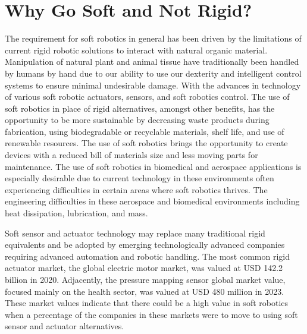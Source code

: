 \section{Why Go Soft and Not Rigid?}
The requirement for soft robotics in general has been driven by the limitations of current rigid robotic solutions to interact with natural organic material. Manipulation of natural plant and animal tissue have traditionally been handled by humans by hand due to our ability to use our dexterity and intelligent control systems to ensure minimal undesirable damage. With the advances in technology of various soft robotic actuators\cite{Stella2023,Zhang2023,Hartmann2021,Yasa2023, Manti2016}, sensors\cite{Hegde2023}, and soft robotics control\cite{DellaSantina2023, Armanini2023}. The use of soft robotics in place of rigid alternatives, amongst other benefits, has the opportunity to be more sustainable by decreasing waste products during fabrication, using biodegradable or recyclable materials, shelf life, and use of renewable resources\cite{Hartmann2021}. The use of soft robotics brings the opportunity to create devices with a reduced bill of materials size and less moving parts for maintenance. The use of soft robotics in biomedical and aerospace applications is especially desirable due to current technology in these environments often experiencing difficulties in certain areas where soft robotics thrives. The engineering difficulties in these aerospace and biomedical environments including heat dissipation, lubrication, and mass\cite{Murugesan1981,Ashuri2020,Branz2017,Bruschi2021}. 

Soft sensor and actuator technology may replace many traditional rigid equivalents and be adopted by emerging technologically advanced companies requiring advanced automation and robotic handling. The most common rigid actuator market, the global electric motor market, was valued at USD 142.2 billion in 2020\cite{alliedmarketresearch}. Adjacently, the pressure mapping sensor global market value, focused mainly on the health sector, was valued at USD 480 million in 2023\cite{Bharatha2023}. These market values indicate that there could be a high value in soft robotics when a percentage of the companies in these markets were to move to using soft sensor and actuator alternatives.


